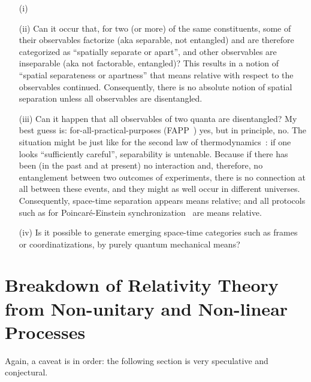\documentclass[entropy,article,accept,oneauthor,pdftex]{Definitions/mdpi}
\begin{document}
\begin{itemize}

\item[(i)]  

\item[(ii)] Can it occur that, for two (or more) of the same constituents, some of their observables factorize (aka separable, not entangled) and are therefore
categorized as ``spatially separate or apart'', and other observables are inseparable (aka not factorable, entangled)? This results in a notion
of ``spatial separateness or apartness'' that means relative with respect to the observables continued.
Consequently, there is no absolute notion of spatial separation unless all observables are disentangled.

\item[(iii)] Can it happen that all observables of two quanta are disentangled? My best guess is: for-all-practical-purposes (FAPP~\cite{bell-a}) yes,
but in principle, no.
The situation might be just like for the second law of thermodynamics~\cite{Myrvold2011237}: if one looks ``sufficiently careful'', separability is untenable.
Because if there has been (in the past and at present) no interaction and, therefore, no entanglement between two outcomes of experiments, there is no connection at all between these events,
and they might as well occur in different universes.
Consequently, space-time separation appears means relative; and all protocols such as for Poincar\'e-Einstein synchronization~\cite{ein-05,Minguzzi_2011}
are means relative.


\item[(iv)] Is it possible to generate emerging space-time categories such as frames or coordinatizations, by purely quantum mechanical means?

\end{itemize}

\section{Breakdown of Relativity Theory from Non-unitary and Non-linear Processes}

Again, a caveat is in order: the following section is very speculative and conjectural.
\end{document}
